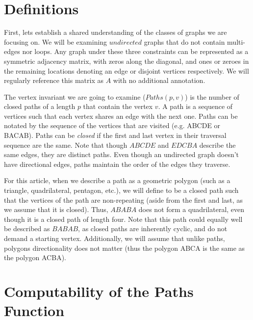 \documentclass[a4paper,12pt]{article}
\begin{document}
\section*{Definitions}

First, lets establish a shared understanding of the classes of graphs we are focusing on.  We will be examining \(undirected\) graphs that do not contain multi-edges nor loops.  Any graph under these three constraints can be represented as a symmetric adjacency matrix, with zeros along the diagonal, and ones or zeroes in the remaining locations denoting an edge or disjoint vertices respectively. We will regularly reference this matrix as \(A\) with no additional annotation.

The vertex invariant we are going to examine (\(Paths(p, v)\)) is the number of closed paths of a length \(p\) that contain the vertex \(v\). A path is a sequence of vertices such that each vertex shares an edge with the next one. Paths can be notated by the sequence of the vertices that are visited (e.g. ABCDE or BACAB). Paths can be \emph{closed} if the first and last vertex in their traversal sequence are the same. Note that though \(ABCDE\) and \(EDCBA\) describe the same edges, they are distinct paths.  Even though an undirected graph doesn't have directional edges, paths maintain the order of the edges they traverse.

For this article, when we describe a path as a geometric polygon (such as a triangle, quadrilateral, pentagon, etc.), we will define to be a closed path such that the vertices of the path are non-repeating (aside from the first and last, as we assume that it is closed). Thus, \(ABABA\) does not form a quadrilateral, even though it is a closed path of length four. Note that this path could equally well be described as \(BABAB\), as closed paths are inherently cyclic, and do not demand a starting vertex.  Additionally, we will assume that unlike paths, polygons directionality does not matter (thus the polygon ABCA is the same as the polygon ACBA). 



\section*{Computability of the Paths Function}
\end{document}
